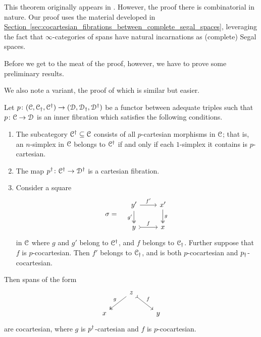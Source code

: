 \documentclass[main.tex]{subfiles}
\begin{document}
This theorem originally appears in \cite{spectralmackeyfunctors1}. However, the proof there is combinatorial in nature. Our proof uses the material developed in \hyperref[sec:cocartesian_fibrations_between_complete_segal_spaces]{Section~\ref*{sec:cocartesian_fibrations_between_complete_segal_spaces}}, leveraging the fact that $\infty$-categories of spans have natural incarnations as (complete) Segal spaces.

Before we get to the meat of the proof, however, we have to prove some preliminary results.

We also note a variant, the proof of which is similar but easier.

\begin{theorem}
  \label{thm:new_barwick}
  Let $p\colon (\mathcal{C}, \mathcal{C}_{\dagger}, \mathcal{C}^{\dagger}) \to (\mathcal{D}, \mathcal{D}_{\dagger}, \mathcal{D}^{\dagger})$ be a functor between adequate triples such that $p\colon \mathcal{C} \to \mathcal{D}$ is an inner fibration which satisfies the following conditions.
  \begin{enumerate}
    \item The subcategory $\mathcal{C}^{\dagger} \subseteq \mathcal{C}$ consists of all $p$-cartesian morphisms in $\mathcal{C}$; that is, an $n$-simplex in $\mathcal{C}$ belongs to $\mathcal{C}^{\dagger}$ if and only if each $1$-simplex it contains is $p$-cartesian.

    \item The map $p^{\dagger}\colon \mathcal{C}^{\dagger} \to \mathcal{D}^{\dagger}$ is a cartesian fibration.

    \item Consider a square
      \begin{equation*}
          \sigma = \quad
          \begin{tikzcd}
            y'
            \arrow[r, "f'"]
            \arrow[d, two heads, swap, "g'"]
            & x'
            \arrow[d, two heads, "g"]
            \\
            y
            \arrow[r, rightarrowtail, "f"]
            & x
          \end{tikzcd}
      \end{equation*}
      in $\mathcal{C}$ where $g$ and $g'$ belong to $\mathcal{C}^{\dagger}$, and $f$ belongs to $\mathcal{C}_{\dagger}$. Further suppose that $f$ is $p$-cocartesian. Then $f'$ belongs to $\mathcal{C}_{\dagger}$, and is both $p$-cocartesian and $p_{\dagger}$-cocartesian.
  \end{enumerate}
  Then spans of the form
  \begin{equation*}
    \begin{tikzcd}
      & z
      \arrow[dl, two heads, swap, "g"]
      \arrow[dr, rightarrowtail, "f"]
      \\
      x
      && y
    \end{tikzcd}
  \end{equation*}
  are cocartesian, where $g$ is $p^{\dagger}$-cartesian and $f$ is $p$-cocartesian.
\end{theorem}
\end{document}
